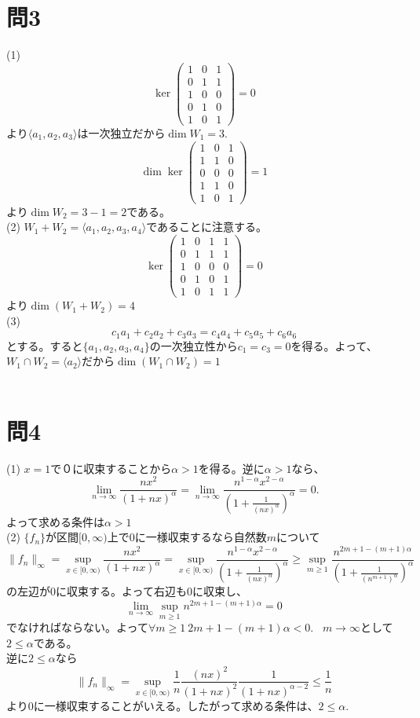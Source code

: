 ﻿\documentclass{jsarticle}
\begin{document}
\section*{問3}
\noindent
(1)
$$
\ker \begin{pmatrix}1&0&1 \\ 0&1&1 \\ 1&0&0 \\ 0&1&0 \\ 1&0&1 \end{pmatrix} = 0
$$
より$\langle a_1, a_2, a_3 \rangle$は一次独立だから$\dim W_1 = 3$.
$$
\dim \ker \begin{pmatrix}1&0&1 \\ 1&1&0 \\ 0&0&0 \\ 1&1&0 \\ 1&0&1 \end{pmatrix} = 1
$$
より$\dim W_2 = 3 - 1 =2$である。\\
(2) $W_1 + W_2 = \langle a_1, a_2, a_3 , a_4 \rangle$であることに注意する。
$$
\ker \begin{pmatrix}1&0&1&1 \\ 0&1&1&1 \\ 1&0&0&0 \\ 0&1&0&1 \\ 1&0&1&1 \end{pmatrix} = 0
$$
より$\dim (W_1 + W_2) = 4$ \\
(3)
$$
c_1a_1 + c_2a_2 + c_3a_3 = c_4a_4 + c_5a_5 + c_6a_6
$$
とする。すると$\{ a_1, a_2, a_3 , a_4\}$の一次独立性から$c_1 = c_3 = 0$を得る。よって、$W_1 \cap W_2 = \langle a_2 \rangle $だから$\dim (W_1 \cap W_2) = 1$ \\ \\

\section*{問4}
\noindent
(1) $x = 1$で０に収束することから$\alpha > 1$を得る。逆に$\alpha > 1$なら、
$$
\lim_{n \to \infty} \frac{nx^2}{(1 + nx)^{\alpha}}
=\lim_{n \to \infty} \frac{n^{1-\alpha}x^{2 - \alpha}}{(1 + \frac{1}{(nx)^{\alpha}})^{\alpha}} = 0.
$$
よって求める条件は$\alpha > 1$　\\
(2) $\{ f_n\}$が区間$[0, \infty)$上で0に一様収束するなら自然数$m$について
$$
\| f_n\|_{\infty} = \sup_{x \in [0, \infty)} \frac{nx^2}{(1 + nx)^{\alpha}}
=\sup_{x \in [0, \infty)} \frac{n^{1-\alpha}x^{2 - \alpha}}{(1 + \frac{1}{(nx)^{\alpha}})^{\alpha}}
\geq \sup_{m \geq 1} \frac{n^{2m+1-(m+1)\alpha}}{(1+\frac{1}{(n^{m+1})^{\alpha}})^{\alpha}}
$$
の左辺が0に収束する。よって右辺も0に収束し、
$$
\lim_{n \to \infty} \sup_{m \geq 1} n^{2m+1-(m+1)\alpha} = 0
$$
でなければならない。よって$\forall m \geq 1 \ 2m+1-(m+1)\alpha < 0$. \ $m \rightarrow \infty$として$2 \leq \alpha $である。\\
逆に$2 \leq \alpha $なら
$$
\| f_n\|_{\infty} = \sup_{x \in [0, \infty)} \frac{1}{n} \frac{(nx)^2}{(1 + nx)^{2}} \frac{1}{(1+nx)^{\alpha - 2}}
\leq \frac{1}{n}
$$
より0に一様収束することがいえる。したがって求める条件は、$2 \leq \alpha $.
\end{document}
